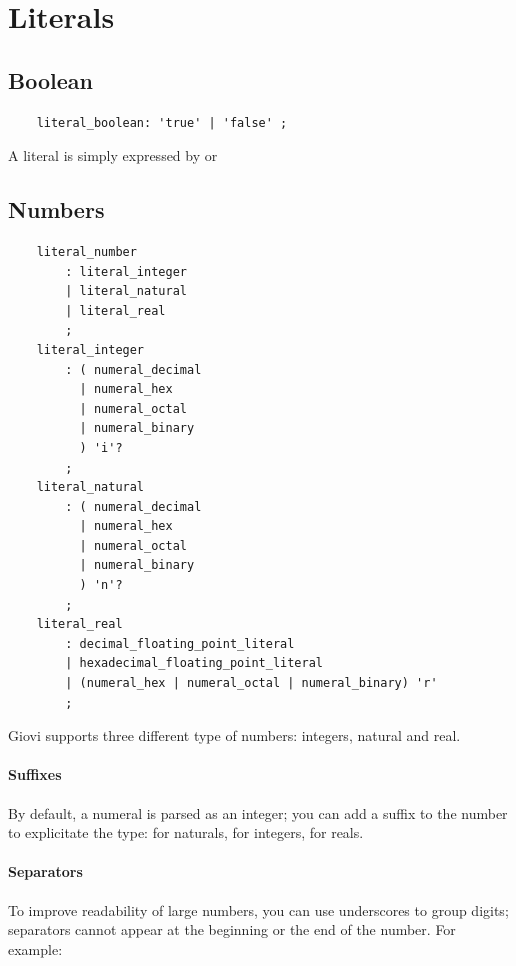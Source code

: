 
\clearpage

\section{Literals}

\subsection{Boolean}

\begin{verbatim}
	literal_boolean: 'true' | 'false' ;
\end{verbatim}

A  literal is simply expressed by  or 

\subsection{Numbers}

\begin{verbatim}
	literal_number
		: literal_integer
		| literal_natural
		| literal_real
		;
	literal_integer
		: ( numeral_decimal
		  | numeral_hex
		  | numeral_octal
		  | numeral_binary
		  ) 'i'?
		;
	literal_natural
		: ( numeral_decimal
		  | numeral_hex
		  | numeral_octal
		  | numeral_binary
		  ) 'n'?
		;
	literal_real
		: decimal_floating_point_literal
		| hexadecimal_floating_point_literal
		| (numeral_hex | numeral_octal | numeral_binary) 'r'
		;
\end{verbatim}

Giovi supports three different type of numbers: integers, natural and real.

\paragraph{Suffixes} By default, a numeral is parsed as an integer; you can
add a suffix to the number to explicitate the type:  for naturals,
 for integers,  for reals.   

\paragraph{Separators} To improve readability of large numbers, you can use
underscores to group digits; separators cannot appear at the beginning or the
end of the number. For example: 

